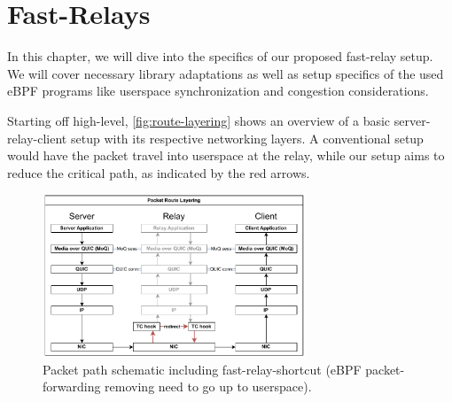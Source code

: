 
\chapter{Fast-Relays}\label{chap:fast_relays}

In this chapter, we will dive into the specifics of our proposed fast-relay setup.
We will cover necessary library adaptations as well as setup specifics of the used 
eBPF programs like userspace synchronization and congestion considerations.

Starting off high-level, \autoref{fig:route-layering} shows an overview of a basic 
server-relay-client setup with its respective networking layers.
A conventional setup would have the packet travel into userspace at the relay, 
while our setup aims to reduce the critical path, as indicated by the red arrows.

\vspace{0.5cm}
\begin{figure}[htbp] %
    \centering
    \includegraphics[width=0.7\textwidth]{figures/03_fast_relays/route-layering.drawio.pdf}
    \caption[Packet path schematic regarding network stack]{Packet path schematic including 
    fast-relay-shortcut (eBPF packet-forwarding removing need to go up to userspace).}\label{fig:route-layering}
\end{figure}








